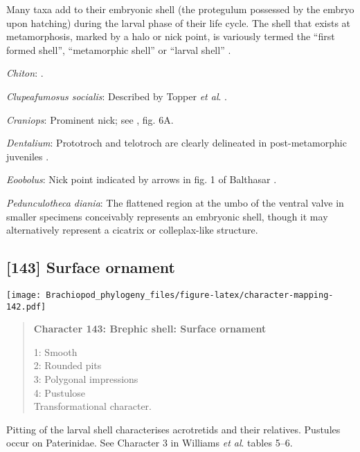 \documentclass[openany]{book}
\theoremstyle{definition}
\theoremstyle{definition}
\theoremstyle{definition}
\theoremstyle{remark}
\begin{document}
Many taxa add to their embryonic shell (the protegulum possessed by the
embryo upon hatching) during the larval phase of their life cycle. The
shell that exists at metamorphosis, marked by a halo or nick point, is
variously termed the ``first formed shell'', ``metamorphic shell'' or
``larval shell'' \citep{Bassett2017Earliestontogeny}.

\hypertarget{Chiton-coding-142}{}
\emph{Chiton}: \citet{Wanninger2002C}.

\hypertarget{Clupeafumosus_socialis-coding-142}{}
\emph{Clupeafumosus socialis}: Described by Topper \emph{et al}.
\citeyearpar{Topper2013Reappraisalof}.

\hypertarget{Craniops-coding-142}{}
\emph{Craniops}: Prominent nick; see \citet{Freeman1999Changesin}, fig.
6A.

\hypertarget{Dentalium-coding-142}{}
\emph{Dentalium}: Prototroch and telotroch are clearly delineated in
post-metamorphic juveniles \citep{Wanninger2001}.

\hypertarget{Eoobolus-coding-142}{}
\emph{Eoobolus}: Nick point indicated by arrows in fig. 1 of Balthasar
\citeyearpar{Balthasar2009Thebrachiopod}.

\hypertarget{Pedunculotheca_diania-coding-142}{}
\emph{Pedunculotheca diania}: The flattened region at the umbo of the
ventral valve in smaller specimens conceivably represents an embryonic
shell, though it may alternatively represent a cicatrix or
colleplax-like structure.

\subsection*{{[}143{]} Surface ornament}\label{surface-ornament}

\texttt{[image: Brachiopod\_phylogeny\_files/figure-latex/character-mapping-142.pdf]}

\begin{quote}
\textbf{Character 143: Brephic shell: Surface ornament}

1: Smooth\\
2: Rounded pits\\
3: Polygonal impressions\\
4: Pustulose\\
Transformational character.
\end{quote}

Pitting of the larval shell characterises acrotretids and their
relatives. Pustules occur on Paterinidae. See Character 3 in Williams
\emph{et al}. \citeyearpar{Williams2000LinguliformeaCraniiformea} tables
5--6.
\end{document}
